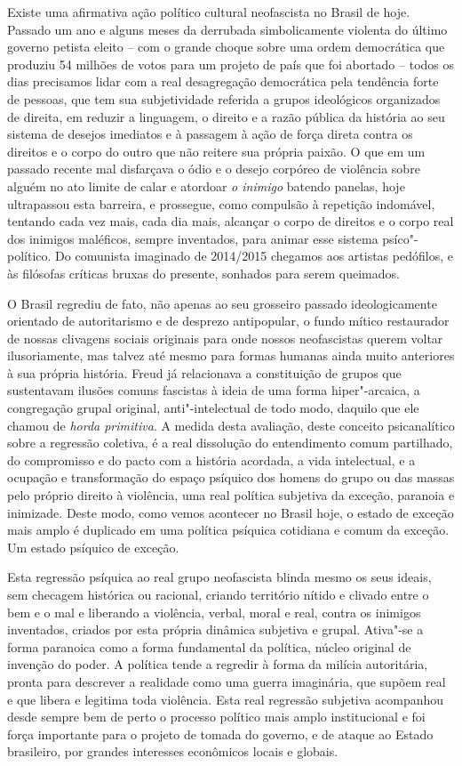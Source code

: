 Existe uma afirmativa ação político cultural neofascista no Brasil de
hoje. Passado um ano e alguns meses da derrubada simbolicamente violenta
do último governo petista eleito -- com o grande choque sobre uma ordem
democrática que produziu 54 milhões de votos para um projeto de país que
foi abortado -- todos os dias precisamos lidar com a real desagregação
democrática pela tendência forte de pessoas, que tem sua subjetividade
referida a grupos ideológicos organizados de direita, em reduzir a
linguagem, o direito e a razão pública da história ao seu sistema de
desejos imediatos e à passagem à ação de força direta contra os direitos
e o corpo do outro que não reitere sua própria paixão. O que em um
passado recente mal disfarçava o ódio e o desejo corpóreo de violência
sobre alguém no ato limite de calar e atordoar \emph{o inimigo} batendo
panelas, hoje ultrapassou esta barreira, e prossegue, como compulsão à
repetição indomável, tentando cada vez mais, cada dia mais, alcançar o
corpo de direitos e o corpo real dos inimigos maléficos, sempre
inventados, para animar esse sistema psíco"-político. Do comunista
imaginado de 2014/2015 chegamos aos artistas pedófilos, e às filósofas
críticas bruxas do presente, sonhados para serem queimados.

O Brasil regrediu de fato, não apenas ao seu grosseiro passado
ideologicamente orientado de autoritarismo e de desprezo antipopular, o
fundo mítico restaurador de nossas clivagens sociais originais para onde
nossos neofascistas querem voltar ilusoriamente, mas talvez até mesmo
para formas humanas ainda muito anteriores à sua própria história. Freud
já relacionava a constituição de grupos que sustentavam ilusões comuns
fascistas à ideia de uma forma hiper"-arcaica, a congregação grupal
original, anti"-intelectual de todo modo, daquilo que ele chamou de
\emph{horda primitiva}. A medida desta avaliação, deste conceito
psicanalítico sobre a regressão coletiva, é a real dissolução do
entendimento comum partilhado, do compromisso e do pacto com a história
acordada, a vida intelectual, e a ocupação e transformação do espaço
psíquico dos homens do grupo ou das massas pelo próprio direito à
violência, uma real política subjetiva da exceção, paranoia e inimizade.
Deste modo, como vemos acontecer no Brasil hoje, o estado de exceção
mais amplo é duplicado em uma política psíquica cotidiana e comum da
exceção. Um estado psíquico de exceção.

Esta regressão psíquica ao real grupo neofascista blinda mesmo os seus
ideais, sem checagem histórica ou racional, criando território nítido e
clivado entre o bem e o mal e liberando a violência, verbal, moral e
real, contra os inimigos inventados, criados por esta própria dinâmica
subjetiva e grupal. Ativa"-se a forma paranoica como a forma fundamental
da política, núcleo original de invenção do poder. A política tende a
regredir à forma da milícia autoritária, pronta para descrever a
realidade como uma guerra imaginária, que supõem real e que libera e
legitima toda violência. Esta real regressão subjetiva acompanhou desde
sempre bem de perto o processo político mais amplo institucional e foi
força importante para o projeto de tomada do governo, e de ataque ao
Estado brasileiro, por grandes interesses econômicos locais e globais.

